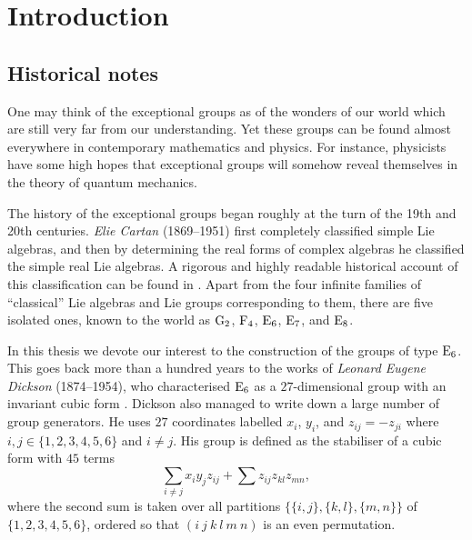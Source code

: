 \chapter{Introduction}
\ifpdf
    \graphicspath{{Introduction/IntroductionFigs/PNG/}{Introduction/IntroductionFigs/PDF/}{Introduction/IntroductionFigs/}}
\else
    \graphicspath{{Introduction/IntroductionFigs/EPS/}{Introduction/IntroductionFigs/}}
\fi
\label{Intro}

\section{{Historical notes}}

One may think of the exceptional groups as of the wonders of our
world which are still very far from our understanding. Yet these
groups can be found almost everywhere in contemporary mathematics
and physics. For instance, physicists have some high hopes that
exceptional groups will somehow reveal themselves in the theory
of quantum mechanics. 

The history of the exceptional groups began roughly at the turn
of the 19th and 20th centuries. \textit{Elie Cartan} (1869--1951)
first completely classified simple Lie algebras, and then by 
determining the real forms of complex algebras he classified the
simple real Lie algebras. A rigorous and highly readable historical
account of this classification can be found in 
\cite{HawkinsThomas}. Apart from the four infinite families
of ``classical'' Lie algebras and Lie groups corresponding to
them, there are five isolated ones, known to the world as
$\mathrm{G}_2$, $\mathrm{F}_4$, $\mathrm{E}_6$, $\mathrm{E}_7$, and $\mathrm{E}_8$.

In this thesis we devote our interest to the construction of the
groups of type $\mathrm{E}_6$. This goes back more than a hundred years
to the works of \textit{Leonard Eugene Dickson} (1874--1954),
who characterised $\mathrm{E}_6$ as a $27$-dimensional group with an
invariant cubic form \cite{Dickson1, Dickson2}. 
Dickson also managed to write down a 
large number of group generators. He uses $27$ coordinates
labelled $x_i$, $y_i$, and $z_{ij} = -z_{ji}$ where 
$i,j \in \{1,2,3,4,5,6\}$ and $i \neq j$. His group is defined
as the stabiliser of a cubic form with $45$ terms
\begin{equation}
	\sum\limits_{i \neq j} x_i y_j z_{ij} + 
	\sum z_{ij} z_{kl} z_{mn},
\end{equation}
where the second sum is taken over all partitions 
$\{\{i, j\}, \{k, l\}, \{m, n\}\}$ of 
$\{1,2,3,4,5,6\}$, ordered so that $(i\ j\ k\ l\ m\ n)$ is 
an even permutation.

